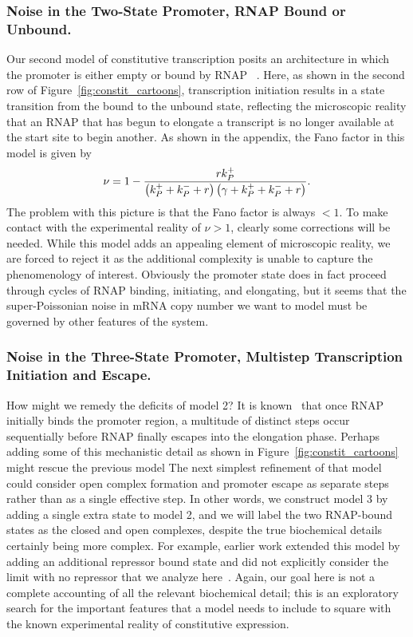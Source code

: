 \subsubsection{Noise in the Two-State Promoter, RNAP Bound or Unbound.}
Our second model of constitutive transcription posits an architecture
in which the promoter is either empty or bound by RNAP
~\cite{Phillips2015a, Phillips2019}. Here,  as shown in 
the second row of Figure~\ref{fig:constit_cartoons},  transcription initiation results in
a state transition from the bound to
the unbound state, reflecting the microscopic reality that an RNAP that has
begun to elongate a transcript is no longer available at the start site to begin
another.  As shown in the appendix, the Fano factor in this model is given by
\begin{align}
    \nu = 1 -
        \frac{r{k}_{P}^{+}}
            {\left({k}_{P}^{+} + {k}_{P}^{-} + r\right)
             \left(\gamma + {k}_{P}^{+} + {k}_{P}^{-} + r\right)}.
\end{align}
The problem with this picture is that the Fano factor is
 always $<1$. 
 To make contact with the experimental reality of $\nu>1$,
clearly some corrections will be needed.
While this model adds an appealing element of microscopic
reality, we are forced to reject it as the additional complexity is unable to
capture the phenomenology of interest. Obviously the promoter state does in fact
proceed through cycles of RNAP binding, initiating, and elongating, but it seems
that the super-Poissonian noise in mRNA copy number we want to model must be
governed by other features of the system.

\subsubsection{Noise in the Three-State Promoter, Multistep Transcription
Initiation and Escape.} How might we remedy the deficits of model 2? It is
known~\cite{DeHaseth1998} that once RNAP initially binds the promoter region, a
multitude of distinct steps occur sequentially before RNAP finally escapes into
the elongation phase. Perhaps adding some of this mechanistic detail as shown
in Figure~\ref{fig:constit_cartoons} might
rescue the previous model   The next simplest refinement of that model could consider open
complex formation and promoter escape as separate steps rather than as a single
effective step. In other words, we construct model 3 by adding a single extra
state to model 2, and we will label the two RNAP-bound states as the closed and
open complexes, despite the true biochemical details certainly being more
complex.  For example, earlier work extended this model by adding an additional
repressor bound state and did not explicitly consider the limit with no repressor
that we analyze here~\cite{Mitarai2015}.  Again, our goal here
is not a complete accounting of all the relevant biochemical detail; this is an
exploratory search for the important features that a model needs to include
to square with the known experimental reality of constitutive expression.

